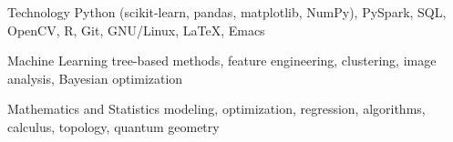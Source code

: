 

\begin{cvskills}

  \cvskill
    {Technology} %
    {Python (scikit-learn, pandas, matplotlib, NumPy), PySpark, SQL, OpenCV, R, Git, GNU/Linux, LaTeX, Emacs} %

  \cvskill
    {Machine Learning} %
    {tree-based methods, feature engineering, clustering, image analysis, Bayesian optimization} %

  \cvskill
    {Mathematics and Statistics} %
    {modeling, optimization, regression, algorithms, calculus, topology, quantum geometry} %

\end{cvskills}
